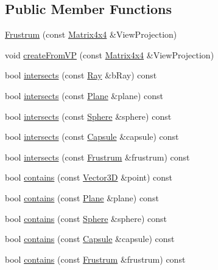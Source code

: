 \subsection*{Public Member Functions}
\begin{DoxyCompactItemize}
\item 
\hyperlink{classdrider_s_d_k_1_1_frustrum_a4a79e8234bbf25c8cf850f01a6485a1a}{Frustrum} (const \hyperlink{classdrider_s_d_k_1_1_matrix4x4}{Matrix4x4} \&View\+Projection)
\item 
void \hyperlink{classdrider_s_d_k_1_1_frustrum_a852e86146dc8621a99c5581e03d587de}{create\+From\+VP} (const \hyperlink{classdrider_s_d_k_1_1_matrix4x4}{Matrix4x4} \&View\+Projection)
\item 
bool \hyperlink{classdrider_s_d_k_1_1_frustrum_ad81116f896faad5acada10c16c3e7518}{intersects} (const \hyperlink{classdrider_s_d_k_1_1_ray}{Ray} \&b\+Ray) const
\item 
bool \hyperlink{classdrider_s_d_k_1_1_frustrum_ae816e17c5b6d6829a92e73d79305b224}{intersects} (const \hyperlink{classdrider_s_d_k_1_1_plane}{Plane} \&plane) const
\item 
bool \hyperlink{classdrider_s_d_k_1_1_frustrum_ab55226117775a0a5a9dd7f6a43faf2c0}{intersects} (const \hyperlink{classdrider_s_d_k_1_1_sphere}{Sphere} \&sphere) const
\item 
bool \hyperlink{classdrider_s_d_k_1_1_frustrum_a3780470da8c8263dec38ecaa267a46e8}{intersects} (const \hyperlink{classdrider_s_d_k_1_1_capsule}{Capsule} \&capsule) const
\item 
bool \hyperlink{classdrider_s_d_k_1_1_frustrum_ae7d0c8ccb2301939f6b41c09d26b8304}{intersects} (const \hyperlink{classdrider_s_d_k_1_1_frustrum}{Frustrum} \&frustrum) const
\item 
bool \hyperlink{classdrider_s_d_k_1_1_frustrum_a9ea85ba52dce08ebf3d18a5241d2d387}{contains} (const \hyperlink{classdrider_s_d_k_1_1_vector3_d}{Vector3D} \&point) const
\item 
bool \hyperlink{classdrider_s_d_k_1_1_frustrum_a274ab52ab613e407bbfbba7d33801287}{contains} (const \hyperlink{classdrider_s_d_k_1_1_plane}{Plane} \&plane) const
\item 
bool \hyperlink{classdrider_s_d_k_1_1_frustrum_a5f13fa643c3a24c64f9419d7de45cffe}{contains} (const \hyperlink{classdrider_s_d_k_1_1_sphere}{Sphere} \&sphere) const
\item 
bool \hyperlink{classdrider_s_d_k_1_1_frustrum_adea6a6bbf8c644411daa82fd3828bae5}{contains} (const \hyperlink{classdrider_s_d_k_1_1_capsule}{Capsule} \&capsule) const
\item 
bool \hyperlink{classdrider_s_d_k_1_1_frustrum_aa0d6748145ce571b0bffdee5d799c091}{contains} (const \hyperlink{classdrider_s_d_k_1_1_frustrum}{Frustrum} \&frustrum) const
\end{DoxyCompactItemize}
